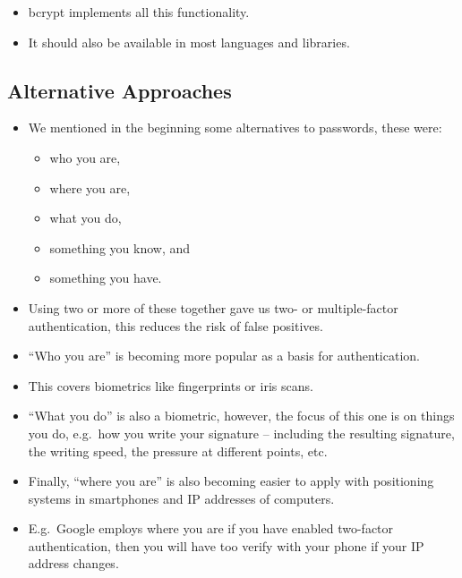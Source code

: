 \begin{frame}
  \begin{itemize}
    \item bcrypt implements all this functionality.
    \item It should also be available in most languages and libraries.
  \end{itemize}
\end{frame}

\subsection{Alternative Approaches}

\begin{frame}
  \begin{itemize}
    \item We mentioned in the beginning some alternatives to passwords, these 
      were:
      \begin{itemize}
        \item who you are,
        \item where you are,
        \item what you do,
        \item something you know, and
        \item something you have.
      \end{itemize}

    \item Using two or more of these together gave us two- or multiple-factor 
      authentication, this reduces the risk of false positives.

  \end{itemize}
\end{frame}

\begin{frame}
  \begin{itemize}
    \item ``Who you are'' is becoming more popular as a basis for 
      authentication.

    \item This covers biometrics like fingerprints or iris scans.

    \item ``What you do'' is also a biometric, however, the focus of this one 
      is on things you do, e.g.\ how you write your signature -- including the 
      resulting signature, the writing speed, the pressure at different points, 
      etc.

    \item Finally, ``where you are'' is also becoming easier to apply with 
      positioning systems in smartphones and IP addresses of computers.

    \item E.g.\ Google employs where you are if you have enabled two-factor 
      authentication, then you will have too verify with your phone if your IP 
      address changes.
  \end{itemize}
\end{frame}

